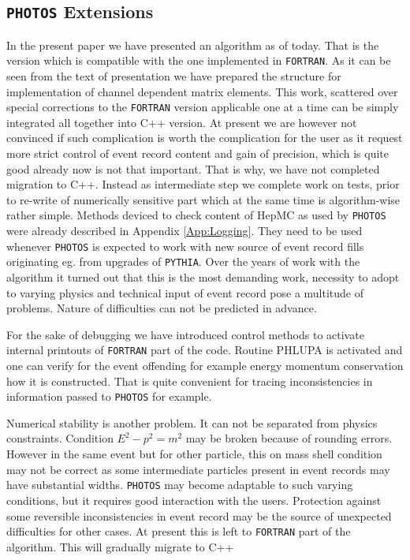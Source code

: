 \documentclass[]{Photos_interface_design}
\begin{document}
\subsection{{\tt PHOTOS} Extensions}
In the present paper we have presented an algorithm as of today. 
That is the version which is compatible with the one implemented in {\tt FORTRAN}.
As it can be seen from the text of presentation we have prepared the structure 
for implementation of channel dependent matrix elements. This work, scattered
 over special corrections to the {\tt FORTRAN} version applicable one at a time can  
be simply integrated all together into C++ version.
 At present we are however not convinced if such complication is worth 
the complication for the user as it request more strict control of event 
record content and gain of precision, which is quite good already now is 
not that important. That is why, we have not completed migration to C++.
Instead as intermediate step we complete work on tests, prior to re-write
 of numerically sensitive part which at the same time is algorithm-wise rather 
simple.
Methods deviced to check content of HepMC as used by {\tt PHOTOS} were already 
described in Appendix \ref{App:Logging}. They need to be used whenever {\tt PHOTOS} 
is expected to work with new source of event record fills originating eg. 
from upgrades of  {\tt PYTHIA}. 
Over the years of work with the algorithm it turned out that this is the
most demanding work, 
necessity to adopt to varying physics and technical input of event record
pose a multitude of problems. Nature of difficulties can not be predicted 
in advance.


For the sake of debugging we have introduced control methods to activate
 internal printouts of {\tt FORTRAN} part of the code.
Routine PHLUPA \cite{Barberio:1993qi} is activated and one can verify  
for the event offending for example  energy momentum conservation how it is 
constructed. That is quite convenient for tracing inconsistencies in 
information passed to {\tt PHOTOS} for example. 


Numerical stability is another  problem. It can not be separated from
 physics constraints. Condition  $E^2-p^2=m^2$ may be broken  because of 
rounding errors. However in the same event but for other particle, this on 
mass shell 
condition may not be correct as some intermediate particles present in event 
records may have substantial widths. 
{\tt PHOTOS} may become adaptable to such varying conditions, but it requires
good interaction with the users. Protection against some reversible
inconsistencies in event record may be the source of unexpected difficulties
for other cases. At present this is left to {\tt FORTRAN} part of the algorithm.
This will gradually migrate to C++
\end{document}
